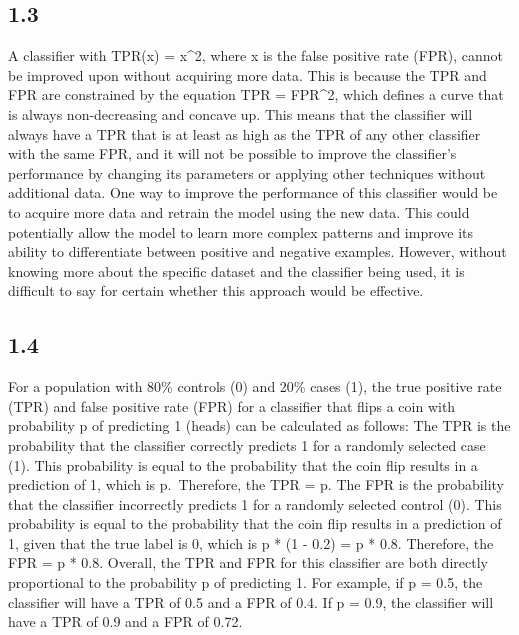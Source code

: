 \documentclass[
  11pt,
]{article}
\begin{document}
\hypertarget{section-2}{%
\subsection{1.3}\label{section-2}}

A classifier with TPR(x) = x\^{}2, where x is the false positive rate
(FPR), cannot be improved upon without acquiring more data. This is
because the TPR and FPR are constrained by the equation TPR = FPR\^{}2,
which defines a curve that is always non-decreasing and concave up. This
means that the classifier will always have a TPR that is at least as
high as the TPR of any other classifier with the same FPR, and it will
not be possible to improve the classifier's performance by changing its
parameters or applying other techniques without additional data. One way
to improve the performance of this classifier would be to acquire more
data and retrain the model using the new data. This could potentially
allow the model to learn more complex patterns and improve its ability
to differentiate between positive and negative examples. However,
without knowing more about the specific dataset and the classifier being
used, it is difficult to say for certain whether this approach would be
effective.

\hypertarget{section-3}{%
\subsection{1.4}\label{section-3}}

For a population with 80\% controls (0) and 20\% cases (1), the true
positive rate (TPR) and false positive rate (FPR) for a classifier that
flips a coin with probability p of predicting 1 (heads) can be
calculated as follows: The TPR is the probability that the classifier
correctly predicts 1 for a randomly selected case (1). This probability
is equal to the probability that the coin flip results in a prediction
of 1, which is p.~Therefore, the TPR = p. The FPR is the probability
that the classifier incorrectly predicts 1 for a randomly selected
control (0). This probability is equal to the probability that the coin
flip results in a prediction of 1, given that the true label is 0, which
is p * (1 - 0.2) = p * 0.8. Therefore, the FPR = p * 0.8. Overall, the
TPR and FPR for this classifier are both directly proportional to the
probability p of predicting 1. For example, if p = 0.5, the classifier
will have a TPR of 0.5 and a FPR of 0.4. If p = 0.9, the classifier will
have a TPR of 0.9 and a FPR of 0.72.
\end{document}
